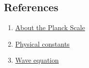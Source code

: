 \subsection{References}

\begin{enumerate}

\item \href{https://newt.phys.unsw.edu.au/einsteinlight/jw/module6_Planck.htm}{About the Planck Scale}

\item \href{http://newton.ex.ac.uk/research/qsystems/collabs/constants.html}{Physical constants}

\item \href{https://www.math.upenn.edu/~deturck/m425/m425-dalembert.pdf}{Wave equation}

\end{enumerate}



